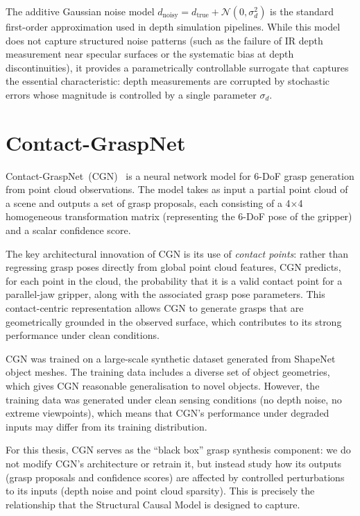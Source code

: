 \documentclass[11pt,a4paper]{report}
\begin{document}
The additive Gaussian noise model $d_{\text{noisy}} = d_{\text{true}} + \mathcal{N}(0, \sigma_d^2)$ is the standard first-order approximation used in depth simulation pipelines. While this model does not capture structured noise patterns (such as the failure of IR depth measurement near specular surfaces or the systematic bias at depth discontinuities), it provides a parametrically controllable surrogate that captures the essential characteristic: depth measurements are corrupted by stochastic errors whose magnitude is controlled by a single parameter $\sigma_d$.

\section{Contact-GraspNet}
\label{sec:bg_cgn}

Contact-GraspNet~(CGN)~\cite{sundermeyer2021contact} is a neural network model for 6-DoF grasp generation from point cloud observations. The model takes as input a partial point cloud of a scene and outputs a set of grasp proposals, each consisting of a 4$\times$4 homogeneous transformation matrix (representing the 6-DoF pose of the gripper) and a scalar confidence score.

The key architectural innovation of CGN is its use of \emph{contact points}: rather than regressing grasp poses directly from global point cloud features, CGN predicts, for each point in the cloud, the probability that it is a valid contact point for a parallel-jaw gripper, along with the associated grasp pose parameters. This contact-centric representation allows CGN to generate grasps that are geometrically grounded in the observed surface, which contributes to its strong performance under clean conditions.

CGN was trained on a large-scale synthetic dataset generated from ShapeNet object meshes. The training data includes a diverse set of object geometries, which gives CGN reasonable generalisation to novel objects. However, the training data was generated under clean sensing conditions (no depth noise, no extreme viewpoints), which means that CGN's performance under degraded inputs may differ from its training distribution.

For this thesis, CGN serves as the ``black box'' grasp synthesis component: we do not modify CGN's architecture or retrain it, but instead study how its outputs (grasp proposals and confidence scores) are affected by controlled perturbations to its inputs (depth noise and point cloud sparsity). This is precisely the relationship that the Structural Causal Model is designed to capture.
\end{document}
